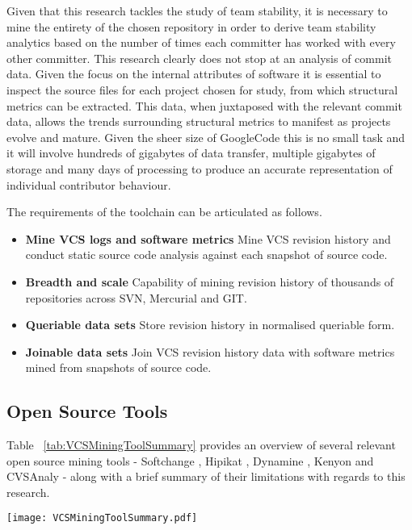 Given that this research tackles the study of team stability, it is necessary to mine the entirety of the chosen repository in order to derive team stability analytics based on the number of times each committer has worked with every other committer. This research clearly does not stop at an analysis of commit data. Given the focus on the internal attributes of software it is essential to inspect the source files for each project chosen for study, from which structural metrics can be extracted. This data, when juxtaposed with the relevant commit data, allows the trends surrounding structural metrics to manifest as projects evolve and mature. Given the sheer size of GoogleCode this is no small task and it will involve hundreds of gigabytes of data transfer, multiple gigabytes of storage and many days of processing to produce an accurate representation of individual contributor behaviour.

The requirements of the toolchain can be articulated as follows.
\begin{itemize}
\item \textbf{Mine VCS logs and software metrics} Mine VCS revision history and conduct static source code analysis against each snapshot of source code.
\item \textbf{Breadth and scale} Capability of mining revision history of thousands of repositories across SVN, Mercurial and GIT.
\item \textbf{Queriable data sets} Store revision history in normalised queriable form.
\item \textbf{Joinable data sets} Join VCS revision history data with software metrics mined from snapshots of source code.
\end{itemize}

\subsection{Open Source Tools}
Table ~\ref{tab:VCSMiningToolSummary} provides an overview of several relevant open source mining tools - Softchange \citep{german2004mining}, Hipikat \citep{vcubranic2003hipikat}, Dynamine \citep{livshits2005dynamine}, Kenyon \citep{bevan2005facilitating} and CVSAnaly \citep{robles2004remote} - along with a brief summary of their limitations with regards to this research.

\begin{table}
\centering 
{}
\begin{tabular}
 \centering 
 \texttt{[image: VCSMiningToolSummary.pdf]}
 \label{tab:VCSMiningToolSummary}
\end{tabular}
\end{table}

